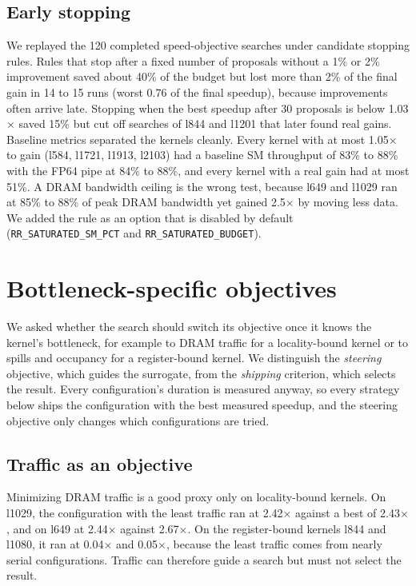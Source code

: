 \documentclass[10pt]{article}
\newcommand{\x}{\ensuremath{\times}}
\newcommand{\code}[1]{\texttt{#1}}
\begin{document}
\subsection{Early stopping}
We replayed the 120 completed speed-objective searches under candidate
stopping rules. Rules that stop after a fixed number of proposals without a
1\% or 2\% improvement saved about 40\% of the budget but lost more than 2\%
of the final gain in 14 to 15 runs (worst 0.76 of the final speedup),
because improvements often arrive late. Stopping when the best speedup after
30 proposals is below 1.03\x{} saved 15\% but cut off searches of l844 and
l1201 that later found real gains. Baseline metrics separated the kernels
cleanly. Every kernel with at most 1.05\x{} to gain (l584, l1721, l1913,
l2103) had a baseline SM throughput of 83\% to 88\% with the FP64 pipe at
84\% to 88\%, and every kernel with a real gain had at most 51\%. A DRAM
bandwidth ceiling is the wrong test, because l649 and l1029 ran at 85\% to
88\% of peak DRAM bandwidth yet gained 2.5\x{} by moving less data. We
added the rule as an option that is disabled by default
(\code{RR\_SATURATED\_SM\_PCT} and \code{RR\_SATURATED\_BUDGET}).

\section{Bottleneck-specific objectives}
\label{sec:targets}

We asked whether the search should switch its objective once it knows the
kernel's bottleneck, for example to DRAM traffic for a locality-bound kernel
or to spills and occupancy for a register-bound kernel. We distinguish the
\emph{steering} objective, which guides the surrogate, from the \emph{shipping}
criterion, which selects the result. Every configuration's duration is
measured anyway, so every strategy below ships the configuration with the best
measured speedup, and the steering objective only changes which
configurations are tried.

\subsection{Traffic as an objective}
Minimizing DRAM traffic is a good proxy only on locality-bound kernels. On
l1029, the configuration with the least traffic ran at 2.42\x{} against a
best of 2.43\x{}, and on l649 at 2.44\x{} against 2.67\x{}. On the
register-bound kernels l844 and l1080, it ran at 0.04\x{} and 0.05\x{},
because the least traffic comes from nearly serial configurations. Traffic
can therefore guide a search but must not select the result.
\end{document}
